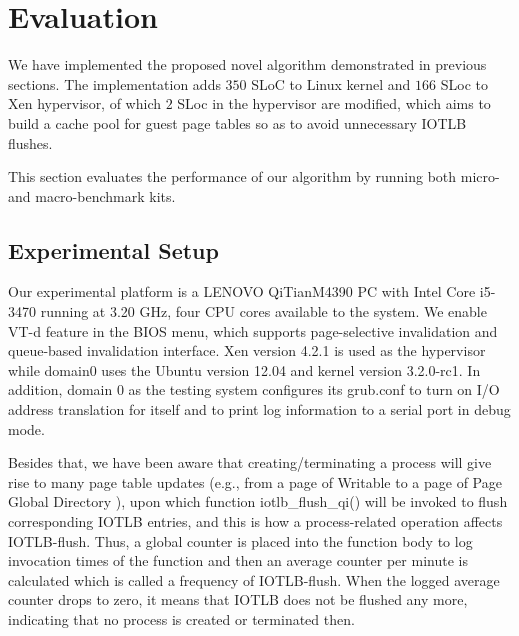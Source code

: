 
\section{Evaluation} \label{sec:eva}

We have implemented the proposed novel algorithm demonstrated in previous sections. The implementation adds $350$ SLoC to Linux kernel and $166$ SLoc to Xen hypervisor, of which $2$ SLoc in the hypervisor are modified, which aims to build a cache pool for guest page tables so as to avoid unnecessary IOTLB flushes.

This section evaluates the performance of our algorithm by running both micro- and macro-benchmark kits.

\subsection{Experimental Setup}

Our experimental platform is a LENOVO QiTianM4390 PC with Intel Core i5-3470 running at 3.20 GHz, four CPU cores available to the system. We enable VT-d feature in the BIOS menu, which supports page-selective invalidation and queue-based invalidation interface. Xen version 4.2.1 is used as the hypervisor while domain0 uses the Ubuntu version 12.04 and kernel version 3.2.0-rc1. In addition, domain 0 as the testing system configures its grub.conf to turn on I/O address translation for itself and to print log information to a serial port in debug mode.

Besides that, we have been aware that creating/terminating a process will give rise to many page table updates (e.g., from a page of Writable to a page of Page Global Directory ), upon which function iotlb\_flush\_qi() will be invoked to flush corresponding IOTLB entries, and this is how a process-related operation affects IOTLB-flush. Thus, a global counter is placed into the function body to log invocation times of the function and then an average counter per minute is calculated which is called a frequency of IOTLB-flush. When the logged average counter drops to zero, it means that IOTLB does not be flushed any more, indicating that no process is created or terminated then.

